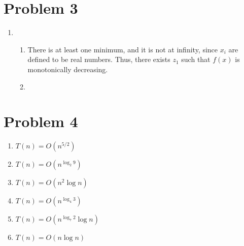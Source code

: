 \documentclass[12pt,a4paper]{article}
\begin{document}
\section*{Problem 3}
	\begin{enumerate}[label=(\alph*)]
		\item 
		\begin{enumerate}[label=(\roman*)]
			\item 
			There is at least one minimum, and it is not at infinity, since $x_i$ are defined to be real numbers. Thus, there exists $z_1$ such that $f(x)$ is monotonically decreasing.

			\item 
			
		\end{enumerate}
	\end{enumerate}

\section*{Problem 4}
	\begin{enumerate}[label=(\alph*)]
		\item $T(n) = O(n^{5/2})$
		\item $T(n) = O(n^{\log_2{9}})$ %
		\item $T(n) = O(n^2 \log n)$ %
		\item $T(n) = O(n^{\log_4{3}})$ %
		\item $T(n) = O(n^{\log_7{2}} \log n)$ %
		\item $T(n) = O(n \log n)$ %
	\end{enumerate}
\end{document}
